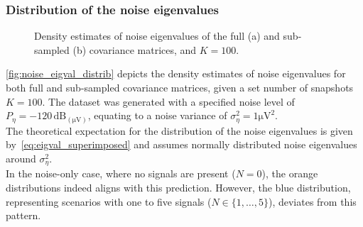 \subsubsection{Distribution of the noise eigenvalues}
\label{subsub:noise_eigval_distrib}
\begin{figure}[H]
    \centering
    \caption{Density estimates of noise eigenvalues of the full (a) and sub-sampled (b) covariance matrices, and \( K = 100 \).}
    \label{fig:noise_eigval_distrib}
\end{figure}

\autoref{fig:noise_eigval_distrib} depicts the density estimates of noise eigenvalues for both full and sub-sampled
covariance matrices, given a set number of snapshots \( K = 100 \).
The dataset was generated with a specified noise level of \( P_\eta = -120 \, \si{\deci\bel}_{(\si{\micro\volt})} \),
equating to a noise variance of \( \sigma^2_\eta = 1 \si{\micro\volt\squared} \). \\
The theoretical expectation for the distribution of the noise eigenvalues is given by~\autoref{eq:eigval_superimposed} and
assumes normally distributed noise eigenvalues around \( \sigma^2_\eta \).\\
In the noise-only case, where no signals are present (\( N = 0 \)), the orange distributions indeed aligns with this prediction.
However, the blue distribution, representing scenarios with one to five signals (\( N \in \{1, \ldots, 5\} \)), deviates
from this pattern.

